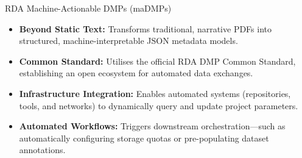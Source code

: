 \documentclass[aspectratio=169]{beamer}
\begin{document}

\begin{frame}{RDA Machine-Actionable DMPs (maDMPs)}
    \begin{itemize}
        \item \textbf{Beyond Static Text:} Transforms traditional, narrative PDFs into structured, machine-interpretable JSON metadata models.
        \item \textbf{Common Standard:} Utilises the official RDA DMP Common Standard, establishing an open ecosystem for automated data exchanges.
        \item \textbf{Infrastructure Integration:} Enables automated systems (repositories, tools, and networks) to dynamically query and update project parameters.
        \item \textbf{Automated Workflows:} Triggers downstream orchestration—such as automatically configuring storage quotas or pre-populating dataset annotations.
    \end{itemize}
\end{frame}
\end{document}
